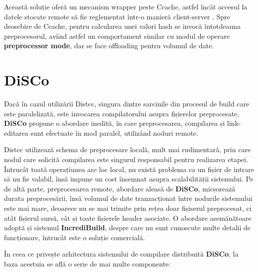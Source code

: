 Această soluție oferă un mecanism wrapper peste Ccache, astfel încât accesul la datele stocate remote
să fie reglementat într-o manieră client-server \cite{saario2020enabling}. Spre deosebire de Ccache,
pentru calcularea unei valori hash se invocă întotdeauna preprocesorul, având astfel un comportament
similar cu modul de operare \textbf{preprocessor mode}, dar se face offloading pentru volumul de 
date.

\section{DiSCo}

Dacă în cazul utilizării Distcc, singura dintre sarcinile din procesul de build care este 
paralelizată, este invocarea compilatorului asupra fișierelor preprocesate, \textbf{DiSCo}
\cite{jo2013disco} propune o abordare inedită, în care preprocesarea, compilarea și 
link-editarea sunt efectuate în mod paralel, utilizând noduri remote.

Distcc utilizează schema de preprocesare locală, mult mai rudimentară, prin care nodul care
solicită compilarea este singurul responsabil pentru realizarea etapei. Întrucât toată operațiunea
are loc local, nu există problema ca un fișier de intrare să nu fie valabil, însă impune un cost
însemnat asupra scalabilității sistemului. Pe de altă parte, preprocesarea remote, abordare aleasă
de \textbf{DiSCo}, micșorează durata preprocesării, însă volumul de date tranzacționat între 
nodurile sistemului este mai mare, deoarece nu se mai trimite prin rețea doar fișiserul preprocesat,
ci atât fișierul sursă, cât și toate fișierele header asociate. O abordare asemănătoare adoptă și
sistemul \textbf{IncrediBuild}\cite{incredibuild}, despre care nu sunt cunoscute multe 
detalii de funcționare, întrucât este o soluție comercială.

În ceea ce privește arhitectura sistemului de compilare distribuită \textbf{DiSCo}, la baza acestuia
se află o serie de mai multe componente:

